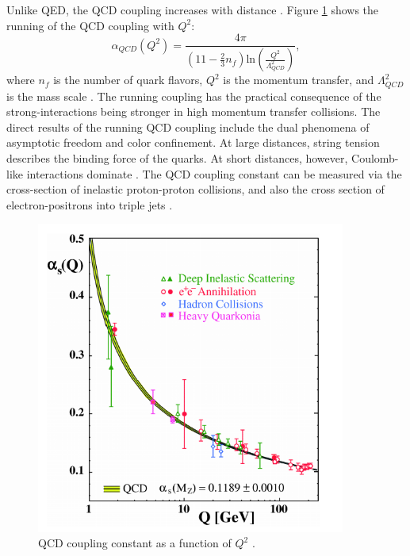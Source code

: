 Unlike QED, the QCD coupling increases with distance \cite{Bethke:2006ac}. Figure \ref{fig:runningQCDCoupling} shows the running of the QCD coupling with $Q^2$:
\begin{equation}
\alpha_{QCD}(Q^2) = \frac{4 \pi }{(11 - \frac{2}{3}n_f)\mathrm{ln}(\frac{Q^2}{\Lambda^2_{QCD}}) } ,
\end{equation}
where $n_f$ is the number of quark flavors, $Q^2$ is the momentum transfer, and  $\Lambda^2_{QCD}$ is the mass scale \cite{Deur:2016tte}. The running coupling has the practical consequence of the strong-interactions being stronger in high momentum transfer collisions. The direct results of the running QCD coupling include the dual phenomena of asymptotic freedom and color confinement. At large distances, string tension describes the binding force of the quarks. At short distances, however, Coulomb-like interactions dominate \cite{Bjorken:1968dy}. The QCD coupling constant can be measured via the cross-section of inelastic proton-proton collisions, and also the cross section of electron-positrons into triple jets \cite{Thomson:2013zua}. 
\begin{figure}[h!]
\begin{centering}
\includegraphics[width=4in]{Chapter1/importfigs/qcd_coupling_bethke.png}
\par\end{centering}
\caption{QCD coupling constant as a function of $Q^2$ \cite{Bethke:2006ac}. \label{fig:runningQCDCoupling}}
\end{figure}

